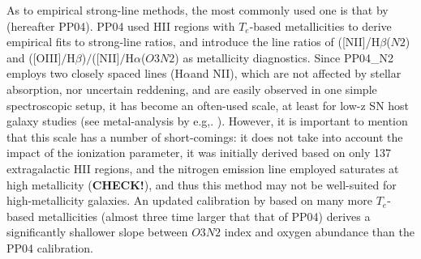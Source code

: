 \documentclass{emulateapj}
\newcommand{\ha}{H$\alpha$}
\newcommand{\hb}{H$\beta$}
\begin{document}
As to empirical strong-line methods, the most commonly used one is that by \citet{pettini04} (hereafter PP04). PP04 used HII regions with $T_e$-based metallicities to derive empirical fits to strong-line ratios, and introduce the line ratios of ([NII]/\hb ($N2$) and ([OIII]$/$\hb)$/$([NII]$/$\ha ($O3N2$) as metallicity diagnostics. Since PP04\_N2 employs two closely spaced lines (\ha and NII), which are not affected by stellar absorption, nor uncertain reddening, and are easily observed in one simple spectroscopic setup, it has become an often-used scale, at least for low-z SN host galaxy studies (see metal-analysis by e.g,. \citealt{sanders12,modjaz12_proc,leloudas14}). However, it is important to mention that this scale has a number of short-comings: it does not take into account the impact of the ionization parameter, it was initially derived based on only 137 extragalactic HII regions, and the nitrogen emission line employed saturates at high metallicity (\textbf{CHECK!}), and thus this method may not be well-suited for high-metallicity galaxies. An updated calibration by \citet{marino13} based on many more $T_e$-based metallicities (almost three time larger that that of PP04) derives a significantly shallower slope between $O3N2$ index and oxygen abundance than the PP04 calibration.

\end{document}
